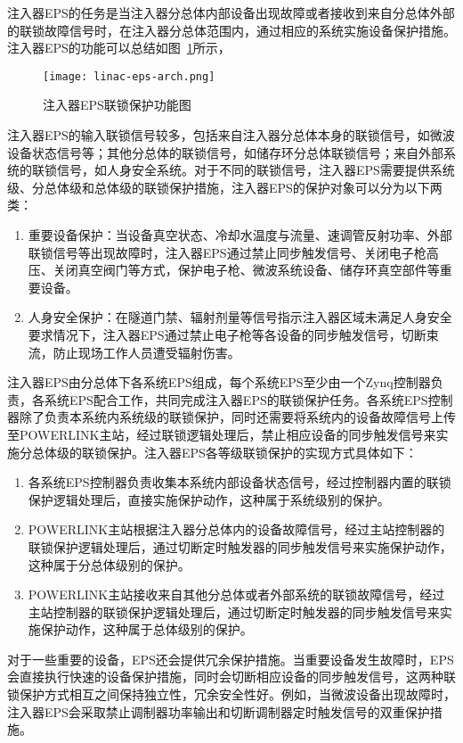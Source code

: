 注入器EPS的任务是当注入器分总体内部设备出现故障或者接收到来自分总体外部的联锁故障信号时，在注入器分总体范围内，通过相应的系统实施设备保护措施。注入器EPS的功能可以总结如图~\ref{fig:linac-eps-arch}所示，

 \begin{figure}[!htb]
	\centering
	\texttt{[image: linac-eps-arch.png]}
	\caption{注入器EPS联锁保护功能图}
	\label{fig:linac-eps-arch}
\end{figure}

注入器EPS的输入联锁信号较多，包括来自注入器分总体本身的联锁信号，如微波设备状态信号等；其他分总体的联锁信号，如储存环分总体联锁信号；来自外部系统的联锁信号，如人身安全系统。对于不同的联锁信号，注入器EPS需要提供系统级、分总体级和总体级的联锁保护措施，注入器EPS的保护对象可以分为以下两类：
\begin{enumerate}
  \item 重要设备保护：当设备真空状态、冷却水温度与流量、速调管反射功率、外部联锁信号等出现故障时，注入器EPS通过禁止同步触发信号、关闭电子枪高压、关闭真空阀门等方式，保护电子枪、微波系统设备、储存环真空部件等重要设备。
  \item 人身安全保护：在隧道门禁、辐射剂量等信号指示注入器区域未满足人身安全要求情况下，注入器EPS通过禁止电子枪等各设备的同步触发信号，切断束流，防止现场工作人员遭受辐射伤害。
\end{enumerate}

注入器EPS由分总体下各系统EPS组成，每个系统EPS至少由一个Zynq控制器负责，各系统EPS配合工作，共同完成注入器EPS的联锁保护任务。各系统EPS控制器除了负责本系统内系统级的联锁保护，同时还需要将系统内的设备故障信号上传至POWERLINK主站，经过联锁逻辑处理后，禁止相应设备的同步触发信号来实施分总体级的联锁保护。注入器EPS各等级联锁保护的实现方式具体如下：
\begin{enumerate}
  \item 各系统EPS控制器负责收集本系统内部设备状态信号，经过控制器内置的联锁保护逻辑处理后，直接实施保护动作，这种属于系统级别的保护。
  \item POWERLINK主站根据注入器分总体内的设备故障信号，经过主站控制器的联锁保护逻辑处理后，通过切断定时触发器的同步触发信号来实施保护动作，这种属于分总体级别的保护。
  \item POWERLINK主站接收来自其他分总体或者外部系统的联锁故障信号，经过主站控制器的联锁保护逻辑处理后，通过切断定时触发器的同步触发信号来实施保护动作，这种属于总体级别的保护。
\end{enumerate}

对于一些重要的设备，EPS还会提供冗余保护措施。当重要设备发生故障时，EPS会直接执行快速的设备保护措施，同时会切断相应设备的同步触发信号，这两种联锁保护方式相互之间保持独立性，冗余安全性好。例如，当微波设备出现故障时，注入器EPS会采取禁止调制器功率输出和切断调制器定时触发信号的双重保护措施。

